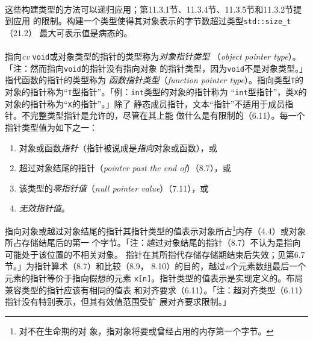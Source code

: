 \paragraph{}
这些构建类型的方法可以递归应用；第11.3.1节、11.3.4节、11.3.5节和11.3.2节提到应用
的限制。构建一个类型使得其对象表示的字节数超过类型\texttt{std::size\_t}（21.2）
最大可表示值是病态的。

\paragraph{}
指向\textit{cv} \texttt{void}或对象类型的指针的类型称为\textit{对象指针类型}
（\textit{object pointer type}）。「注：然而指向\texttt{void}的指针没有指向对象
的指针类型，因为\texttt{void}不是对象类型。」指代函数的指针的类型称为
\textit{函数指针类型}（\textit{function pointer type}）。指向类型\texttt{T}的
对象的指针称为``\texttt{T}型指针''。「例：\texttt{int}类型的对象的指针称为
``\texttt{int}型指针''，类\texttt{X}的对象的指针称为``\texttt{X}的指针''。」除了
静态成员指针，文本``指针''不适用于成员指针。不完整类型指针是允许的，尽管在其上能
做什么是有限制的（6.11）。每一个指针类型值为如下之一：
\begin{enumerate}
  \item{对象或函数\textit{指针}（指针被说成是\textit{指向}对象或函数），或}
  \item{超过对象结尾的指针（\textit{pointer past the end of}）（8.7），或}
  \item{该类型的\textit{零指针值}（\textit{null pointer value}）（7.11），或}
  \item{\textit{无效指针值}。}
\end{enumerate}
指向对象或越过对象结尾的指针其指针类型的值表示对象所占\footnote{对不在生命期的对
象，指对象将要或曾经占用的内存第一个字节。}内存（4.4）或对象所占存储结尾后的第一
个字节。「注：越过对象结尾的指针（8.7）不认为是指向可能处于该位置的不相关对象。
指针在其所指代存储存储期结束后失效；见第6.7节。」为指针算术（8.7）和比较（8.9，
8.10）的目的，越过\textit{n}个元素数组最后一个元素的指针等价于指向假想的元素
\texttt{x[n]}。指针类型的值表示是实现定义的。布局兼容类型的指针应该有相同的值表
和对齐要求（6.11）。「注：超对齐类型（6.11）指针没有特别表示，但其有效值范围受扩
展对齐要求限制。」

